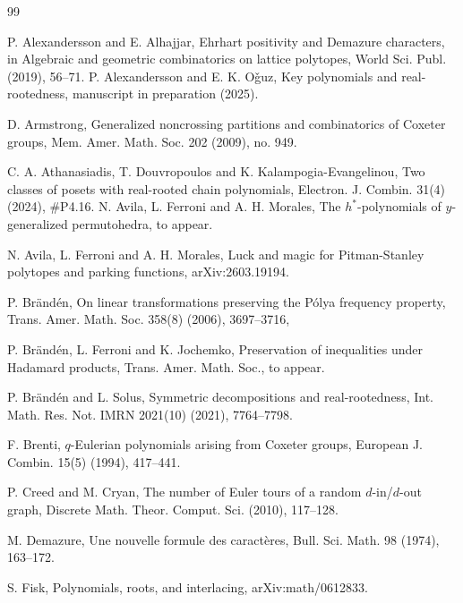 \documentclass[12pt]{article}
\numberwithin{equation}{section}
\begin{document}
\begin{thebibliography}{99}

P. Alexandersson and E. Alhajjar, Ehrhart positivity and Demazure characters, in Algebraic and geometric combinatorics on lattice polytopes, World Sci. Publ. (2019), 56--71.
P. Alexandersson and E. K. O\v{g}uz, Key polynomials and real-rootedness, manuscript in preparation (2025).

D. Armstrong, Generalized noncrossing partitions and combinatorics of Coxeter groups, Mem. Amer. Math. Soc. 202 (2009), no. 949.

C. A. Athanasiadis, T. Douvropoulos and K. Kalampogia-Evangelinou, Two classes of posets with real-rooted chain polynomials, Electron. J. Combin. 31(4) (2024), \#P4.16.
N. Avila, L. Ferroni and A. H. Morales, The $h^*$-polynomials of $y$-generalized permutohedra, to appear. 

N. Avila, L. Ferroni and A. H. Morales, Luck and magic for Pitman-Stanley polytopes and parking functions, arXiv:2603.19194.

P. Br\"and\'en, On linear transformations preserving the P\'olya frequency property, Trans. Amer. Math. Soc. 358(8) (2006), 
3697--3716,

P. Br\"and\'en, L. Ferroni and K. Jochemko, Preservation of inequalities under Hadamard products, Trans. Amer. Math. Soc., to appear.

P. Br\"and\'en and L. Solus, Symmetric decompositions and real-rootedness, Int. Math. Res. Not. IMRN 2021(10) (2021), 7764--7798.

F. Brenti, $q$-Eulerian polynomials arising from Coxeter groups, European J. Combin. 15(5) (1994), 417--441.

P. Creed and M. Cryan, The number of Euler tours of a random $d$-in/$d$-out graph, Discrete Math. Theor. Comput. Sci. (2010), 117--128.

M. Demazure, Une nouvelle formule des caract\`eres, Bull. Sci. Math. 98 (1974), 163--172.

S. Fisk, Polynomials, roots, and interlacing, arXiv:math/0612833.


\end{thebibliography}
\end{document}

